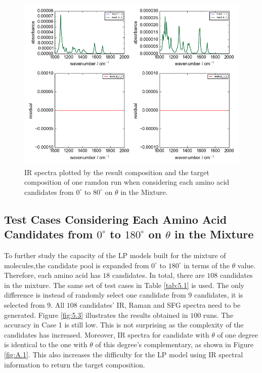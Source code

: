 \begin{figure}[!ht] 
\centering
\includegraphics[scale=0.7]{Figures/chapter5_result_target_residual_plotting__ir_result8_run1.png}
\caption{IR spectra plotted by the result composition and the target composition of one ramdon run when considering each amino acid candidates from $0^{\circ}$ to $80^{\circ}$ on $\theta$ in the Mixture.} \label{fig:5.2}
\end{figure}

\subsection{Test Cases Considering Each Amino Acid Candidates from $0^{\circ}$ to $180^{\circ}$ on $\theta$ in the Mixture}
To further study the capacity of the LP models built for the mixture of molecules,the candidate pool is expanded from $0^{\circ}$ to $180^{\circ}$ in terms of the $\theta$ value. Therefore, each amino acid has $18$ candidates. In total, there are $108$ candidates in the mixture. The same set of test cases in Table \ref{tab:5.1} is used. The only difference is instead of randomly select one candidate from $9$ candidates, it is selected from $9$. All $108$ candidates' IR, Raman and SFG spectra need to be generated. Figure \ref{fig:5.3} illustrates the results obtained in $100$ runs. The accuracy in Case 1 is still low. This is not surprising as the complexity of the candidates has increased. Moreover, IR spectra for candidate with $\theta$ of one degree is identical to the one with $\theta$ of this degree's complementary, as shown in Figure \ref{fig:A.1}. This also increases the difficulty for the LP model using IR spectral information to return the target composition. \\

